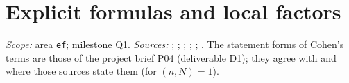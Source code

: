 
\chapter{Explicit formulas and local factors}\label{ch:ch-iii-01-explicit}

\noindent\emph{Scope:} area \texttt{ef}; milestone Q1. \emph{Sources:} \cite[(62), p.~296]{Eic57}; \cite[Prop.~3.1, p.~181, and the sentence after (14), p.~178]{Shz};
\cite[Def.~2.13, p.~353; Thm.~2.25, p.~359]{Piz}; \cite[Thm.~1 and Remarks~1--2, pp.~71--72]{CO}; \cite[Thm.~12.4.11, pp.~477--478]{CoSt};
\cite[Thm.~4.9, p.~9]{Ass}. The statement forms of Cohen's terms are those of the project brief P04 (deliverable D1); they agree with \cite{CoSt} and
\cite{Ass} where those sources state them (for $(n,N)=1$).


